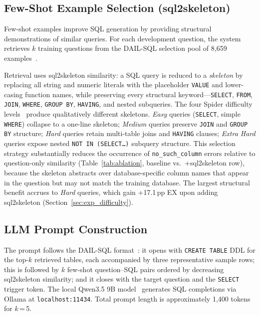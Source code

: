 \subsection{Few-Shot Example Selection (sql2skeleton)}
\label{sec:fewshot}

Few-shot examples improve SQL generation by providing structural
demonstrations of similar queries.
For each development question, the system retrieves $k$ training questions
from the DAIL-SQL selection pool of 8{,}659 examples~\citep{gao2023dailsql}.

Retrieval uses sql2skeleton similarity: a SQL query is reduced to a
\emph{skeleton} by replacing all string and numeric literals with the
placeholder \texttt{VALUE} and lower-casing function names, while
preserving every structural keyword---\texttt{SELECT}, \texttt{FROM},
\texttt{JOIN}, \texttt{WHERE}, \texttt{GROUP BY}, \texttt{HAVING}, and
nested subqueries.
The four Spider difficulty levels~\citep{yu2018spider} produce qualitatively
different skeletons.
\emph{Easy} queries (\texttt{SELECT}, simple \texttt{WHERE}) collapse to a
one-line skeleton; \emph{Medium} queries preserve \texttt{JOIN} and
\texttt{GROUP BY} structure; \emph{Hard} queries retain multi-table joins and
\texttt{HAVING} clauses; \emph{Extra Hard} queries expose nested
\texttt{NOT IN (SELECT\ldots)} subquery structure.
This selection strategy substantially reduces the occurrence of
\texttt{no\_such\_column} errors relative to question-only similarity
(Table~\ref{tab:ablation}, baseline vs.\ +sql2skeleton row), because
the skeleton abstracts over database-specific column names that appear in
the question but may not match the training database.
The largest structural benefit accrues to \emph{Hard} queries, which gain
+17.1\,pp EX upon adding sql2skeleton
(Section~\ref{sec:exp_difficulty}).


\subsection{LLM Prompt Construction}

The prompt follows the DAIL-SQL format~\citep{gao2023dailsql}: it opens with
\texttt{CREATE TABLE} DDL for the top-$k$ retrieved tables, each accompanied
by three representative sample rows; this is followed by $k$ few-shot
question--SQL pairs ordered by decreasing sql2skeleton similarity; and it
closes with the target question and the \texttt{SELECT} trigger token.
The local Qwen3.5 9B model~\citep{qwen2025} generates SQL completions via
Ollama at \texttt{localhost:11434}.
Total prompt length is approximately 1{,}400 tokens for $k$\,=\,5.

